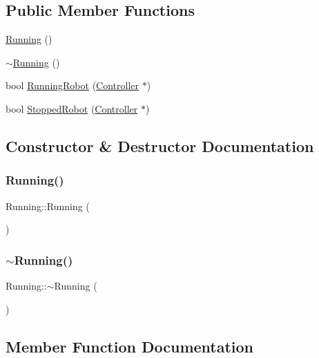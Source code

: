 \subsection*{Public Member Functions}
\begin{DoxyCompactItemize}
\item 
\mbox{\hyperlink{class_running_a4f9dd4f9c1b1ce72f2b65b13d9b4e65a}{Running}} ()
\item 
\mbox{\hyperlink{class_running_a642965fca4984b52e6a65696380035ac}{$\sim$\+Running}} ()
\item 
bool \mbox{\hyperlink{class_running_a61f82d910ea233cff01d7ec1cf00e995}{Running\+Robot}} (\mbox{\hyperlink{class_controller}{Controller}} $\ast$)
\item 
bool \mbox{\hyperlink{class_running_aac21e16784554ee4ac95b9a76310ed42}{Stopped\+Robot}} (\mbox{\hyperlink{class_controller}{Controller}} $\ast$)
\end{DoxyCompactItemize}


\subsection{Constructor \& Destructor Documentation}
\mbox{\label{class_running_a4f9dd4f9c1b1ce72f2b65b13d9b4e65a}} 
\subsubsection{\texorpdfstring{Running()}{Running()}}
{\footnotesize\ttfamily Running\+::\+Running (\begin{DoxyParamCaption}{ }\end{DoxyParamCaption})}

\mbox{\label{class_running_a642965fca4984b52e6a65696380035ac}} 
\subsubsection{\texorpdfstring{$\sim$Running()}{~Running()}}
{\footnotesize\ttfamily Running\+::$\sim$\+Running (\begin{DoxyParamCaption}{ }\end{DoxyParamCaption})}



\subsection{Member Function Documentation}
\mbox{\label{class_running_a61f82d910ea233cff01d7ec1cf00e995}} 
